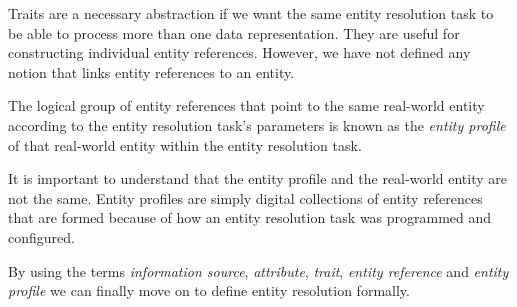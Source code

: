 Traits are a necessary abstraction if we want the same entity resolution
task to be able to process more than one data representation.
They are useful for constructing individual entity references.
However, we have not defined any notion that links entity references to an
entity.

\begin{defn}
    The logical group of entity references that point to the same real-world
    entity according to the entity resolution task's parameters is known as
    the \textit{entity profile} of that real-world entity within the entity
    resolution task.
\end{defn}

It is important to understand that the entity profile and the real-world
entity are not the same.
Entity profiles are simply digital collections of entity references that are
formed because of how an entity resolution task was programmed and
configured.

By using the terms \textit{information source}, \textit{attribute},
\textit{trait}, \textit{entity reference} and \textit{entity profile} we can
finally move on to define entity resolution formally.
